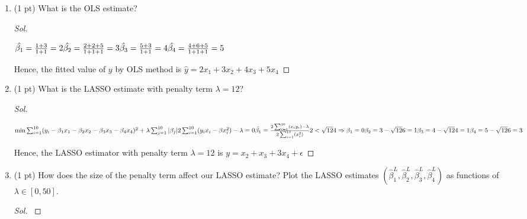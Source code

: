 \documentclass[11pt, oneside]{article}   	%
\newenvironment{Solution}[1][Sol]{%
  \begin{proof}[#1]$ $\par\nobreak\ignorespaces
	\qquad
}{%
  \end{proof}
}
\begin{document}
\begin{enumerate}[resume*]
	\item (1 pt) What is the OLS estimate?
	      \begin{Solution}

            $\hat{\beta_{1}}=\frac{1+3}{1+1}=2\\\\
\hat{\beta_{2}}=\frac{2+2+5}{1+1+1}=3\\\\
\hat{\beta_{3}}=\frac{5+3}{1+1}=4\\\\
\hat{\beta_{4}}=\frac{4+6+5}{1+1+1}=5\\\\$

Hence, the fitted value of $y$ by OLS method is $\hat{y}=2x_{1}+3x_{2}+4x_{3}+5x_{4}$




	      \end{Solution}
	\item (1 pt) What is the LASSO estimate with penalty term $\lambda=12$?
	      \begin{Solution}
            $\min\sum_{i=1}^{10}(y_{i}-\beta_{1}x_{1}-\beta_{2}x_{2}-\beta_{3}x_{3}-\beta_{4}x_{4})^2+\lambda\sum_{j=1}^{10}|\beta_{j}|\\\\
            2\sum_{i=1}^{10}(y_{i}x_{i}-\beta x_{i}^2)-\lambda=0\\\\
            \hat{\beta_{1}}=\frac{2\sum_{i=1}^{10}(x_{i}y_{i})-\lambda}{2\sum_{i=1}^{10}(x_{i}^2)}\\\\
            2<\sqrt{12}{4}  \Rightarrow \beta_{1}=0\\\\
            \beta_{2}=3-\sqrt{12}{6}=1\\\\
            \beta_{3}=4-\sqrt{12}{4}=1\\\\
            \beta_{4}=5-\sqrt{12}{6}=3\\\\$

Hence, the LASSO estimator with penalty term $\lambda=12$  is $y=x_{2}+x_{3}+3x_{4}+\epsilon$
	      \end{Solution}
	\item (1 pt) How does the size of the penalty term affect our LASSO estimate?
	      Plot the LASSO estimates $(\hat{\beta}_1^{L}, \hat{\beta}_2^{L}, \hat{\beta}_3^{L},
		      \hat{\beta}_4^{L})$ as functions of $\lambda\in[0,50]$.
	      \begin{Solution}


\end{Solution}
\end{enumerate}
\end{document}
